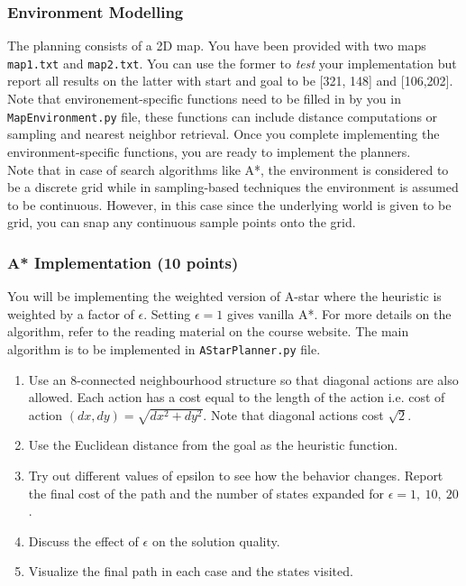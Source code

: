 \documentclass{article}
\newcommand{\?}{\stackrel{?}{=}}
\begin{document}
\subsubsection{Environment Modelling}
The planning consists of a 2D map. You have been provided with two maps \texttt{map1.txt} and \texttt{map2.txt}. You can use the former to \emph{test} your implementation but report all results on the latter with start and goal to be [321, 148] and [106,202]. Note that environement-specific functions need to be filled in by you in \texttt{MapEnvironment.py} file, these functions can include distance computations or sampling and nearest neighbor retrieval. Once you complete implementing the environment-specific functions, you are ready to implement the planners. \\

Note that in case of search algorithms like A*, the environment is considered to be a discrete grid while in sampling-based techniques the environment is assumed to be continuous. However, in this case since the underlying world is given to be grid, you can snap any continuous sample points onto the grid.

\subsubsection{A* Implementation (10 points)}
You will be implementing the weighted version of A-star where the heuristic is weighted by a factor of $\epsilon$. Setting $\epsilon = 1$ gives vanilla A*. For more details on the algorithm, refer to the reading material on the course website. The main algorithm is to be implemented in \texttt{AStarPlanner.py} file.

\begin{enumerate}
\item Use an 8-connected neighbourhood structure so that diagonal actions are also allowed. 
Each action has a cost equal to the length of the action i.e. cost of action $(dx,dy) = \sqrt{dx^2 + dy^2}$. 
Note that diagonal actions cost $\sqrt{2}$.

\item Use the Euclidean distance from the goal as the heuristic function.

\item Try out different values of epsilon to see how the behavior changes. Report the final cost of the path and the number of states expanded for $\epsilon = 1,~10,~20$.

\item Discuss the effect of $\epsilon$ on the solution quality.

\item Visualize the final path in each case and the states visited.
\end{enumerate}
\end{document}
